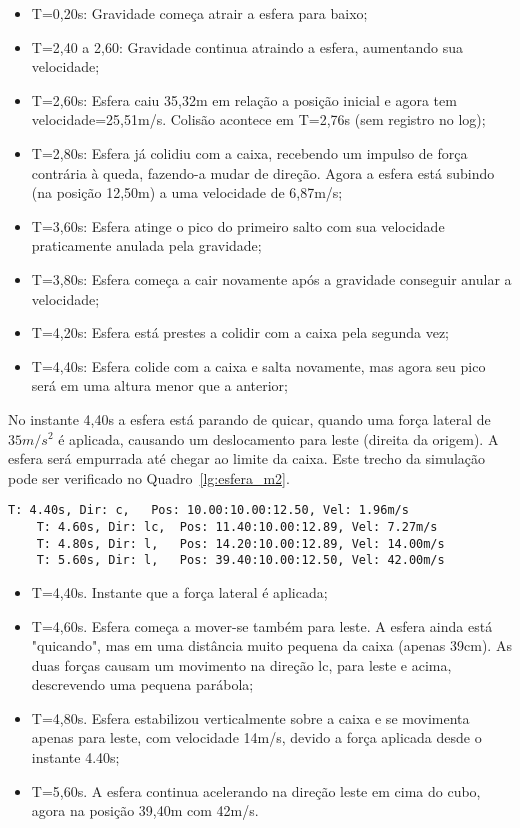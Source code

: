 \documentclass[12pt]{article}
\begin{document}
\begin{itemize}
	\item T=0,20s: Gravidade começa atrair a esfera para baixo;
	\item T=2,40 a 2,60: Gravidade continua atraindo a esfera, aumentando sua velocidade;
	\item T=2,60s: Esfera caiu 35,32m em relação a posição inicial e agora tem velocidade=25,51m/s. Colisão acontece em T=2,76s (sem registro no log);
	\item T=2,80s: Esfera já colidiu com a caixa, recebendo um impulso de força contrária à queda, fazendo-a mudar de direção. Agora a esfera está subindo (na posição 12,50m) a uma velocidade de 6,87m/s;
	\item T=3,60s: Esfera atinge o pico do primeiro salto com sua velocidade praticamente anulada pela gravidade;
	\item T=3,80s: Esfera começa a cair novamente após a gravidade conseguir anular a velocidade;
	\item T=4,20s: Esfera está prestes a colidir com a caixa pela segunda vez;
	\item T=4,40s: Esfera colide com a caixa e salta novamente, mas agora seu pico será em uma altura menor que a anterior;  
\end{itemize}


No instante 4,40s a esfera está parando de quicar, quando uma força lateral de $35m/s^{2}$ é aplicada, causando um deslocamento para leste (direita da origem). A esfera será empurrada até chegar ao limite da caixa. Este trecho da simulação pode ser verificado no Quadro~\ref{lg:esfera_m2}.


\begin{lstlisting}[frame=single,caption=Registro Acessível: Esfera sobre a caixa. \label{lg:esfera_m2}]
	T: 4.40s, Dir: c, 	Pos: 10.00:10.00:12.50, Vel: 1.96m/s
	T: 4.60s, Dir: lc, 	Pos: 11.40:10.00:12.89, Vel: 7.27m/s
	T: 4.80s, Dir: l, 	Pos: 14.20:10.00:12.89, Vel: 14.00m/s
	T: 5.60s, Dir: l, 	Pos: 39.40:10.00:12.50, Vel: 42.00m/s
\end{lstlisting}

\begin{itemize}
	\item T=4,40s. Instante que a força lateral é aplicada;
	\item T=4,60s. Esfera começa a mover-se também para leste. A esfera ainda está "quicando", mas em uma distância muito pequena da caixa (apenas 39cm). As duas forças causam um movimento na direção lc, para leste e acima, descrevendo uma pequena parábola;
	\item T=4,80s. Esfera estabilizou verticalmente sobre a caixa e se movimenta apenas para leste, com velocidade 14m/s, devido a força aplicada desde o instante 4.40s; 
	\item T=5,60s. A esfera continua acelerando na direção leste em cima do cubo, agora na posição 39,40m com 42m/s.
\end{itemize}
\end{document}
